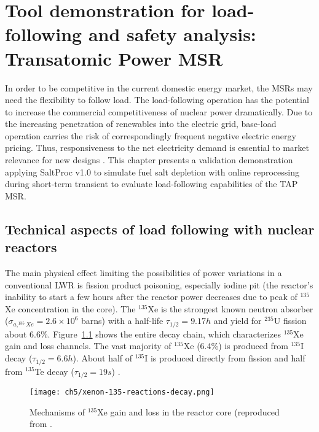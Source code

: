 \chapter{Tool demonstration for load-following and safety analysis: 
Transatomic Power MSR}
In order to be competitive in the current domestic energy market, the 
\glspl{MSR} may need the flexibility to follow load. The load-following 
operation has the potential to increase the commercial 
competitiveness of nuclear power dramatically. Due to the increasing 
penetration of renewables into the electric grid, base-load operation carries 
the risk of correspondingly frequent negative electric energy pricing. Thus, 
responsiveness to the net electricity demand is essential to market relevance 
for new designs \cite{energy_information_administration_u.s._2016}.
This chapter presents a validation demonstration applying SaltProc v1.0 to 
simulate fuel salt depletion with online reprocessing during short-term 
transient to evaluate load-following capabilities of the \gls{TAP} \gls{MSR}.

\section{Technical aspects of load following with nuclear reactors}

The main physical effect limiting the possibilities of power variations in a 
conventional \gls{LWR} is fission product poisoning, especially iodine pit 
(the reactor's inability to start a few hours after the reactor power 
decreases due to peak of $^{135}$Xe concentration in the core). The 
$^{135}$Xe is the strongest known neutron absorber 
($\sigma_{a,^{135}Xe}=2.6\times10^6$ barns) with a half-life 
$\tau_{1/2}=9.17h$ and yield for $^{235}$U fission about 6.6\%. 
Figure~\ref{fig:xe-reaction-chain} shows the entire decay chain, which 
characterizes $^{135}$Xe gain and loss channels. The vast 
majority of $^{135}$Xe (6.4\%) is produced from $^{135}$I decay 
($\tau_{1/2}=6.6h$). About half of $^{135}$I is produced directly from fission 
and half from $^{135}$Te decay ($\tau_{1/2}=19s$) 
\cite{nuclear_power_production_2020}.
\begin{figure}[hbp!] %
	\centering
	\texttt{[image: ch5/xenon-135-reactions-decay.png]}
	\caption{Mechanisms of $^{135}$Xe gain and loss in the reactor core 
		(reproduced from \cite{nuclear_power_production_2020}.}
	\label{fig:xe-reaction-chain}
\end{figure}


